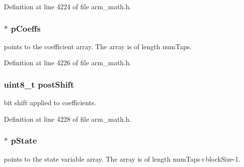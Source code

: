 Definition at line 4224 of file arm\+\_\+math.\+h.

\subsubsection[{\texorpdfstring{p\+Coeffs}{pCoeffs}}]{$\ast$ p\+Coeffs}\hypertarget{structarm__lms__norm__instance__q15_a7ca181a37f714d174445f486bebce26f}{}\label{structarm__lms__norm__instance__q15_a7ca181a37f714d174445f486bebce26f}
points to the coefficient array. The array is of length num\+Taps. 

Definition at line 4226 of file arm\+\_\+math.\+h.

\subsubsection[{\texorpdfstring{post\+Shift}{postShift}}]{\setlength{\rightskip}{0pt plus 5cm}uint8\+\_\+t post\+Shift}\hypertarget{structarm__lms__norm__instance__q15_a74050e9f36542bd56f4052381a82ae8f}{}\label{structarm__lms__norm__instance__q15_a74050e9f36542bd56f4052381a82ae8f}
bit shift applied to coefficients. 

Definition at line 4228 of file arm\+\_\+math.\+h.

\subsubsection[{\texorpdfstring{p\+State}{pState}}]{$\ast$ p\+State}\hypertarget{structarm__lms__norm__instance__q15_ae29dfdb736374fcddaeaec4b7770170c}{}\label{structarm__lms__norm__instance__q15_ae29dfdb736374fcddaeaec4b7770170c}
points to the state variable array. The array is of length num\+Taps+block\+Size-\/1. 

